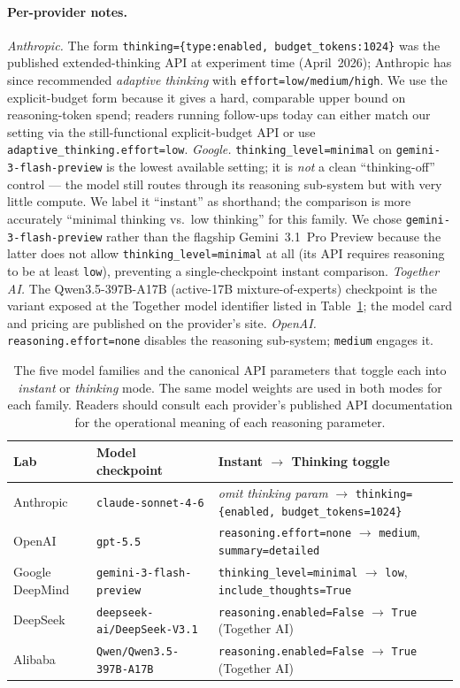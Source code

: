 \documentclass{article}
\begin{document}
\paragraph{Per-provider notes.} \emph{Anthropic.} The form \texttt{thinking=\{type:enabled, budget\_tokens:1024\}} was the published extended-thinking API at experiment time (April~2026); Anthropic has since recommended \emph{adaptive thinking} with \texttt{effort=low/medium/high}. We use the explicit-budget form because it gives a hard, comparable upper bound on reasoning-token spend; readers running follow-ups today can either match our setting via the still-functional explicit-budget API or use \texttt{adaptive\_thinking.effort=low}. \emph{Google.} \texttt{thinking\_level=minimal} on \texttt{gemini-3-flash-preview} is the lowest available setting; it is \emph{not} a clean ``thinking-off'' control --- the model still routes through its reasoning sub-system but with very little compute. We label it ``instant'' as shorthand; the comparison is more accurately ``minimal thinking vs.\ low thinking'' for this family. We chose \texttt{gemini-3-flash-preview} rather than the flagship Gemini~3.1~Pro Preview because the latter does not allow \texttt{thinking\_level=minimal} at all (its API requires reasoning to be at least \texttt{low}), preventing a single-checkpoint instant comparison. \emph{Together AI.} The Qwen3.5-397B-A17B (active-17B mixture-of-experts) checkpoint is the variant exposed at the Together model identifier listed in Table~\ref{tab:models}; the model card and pricing are published on the provider's site. \emph{OpenAI.} \texttt{reasoning.effort=none} disables the reasoning sub-system; \texttt{medium} engages it.

\begin{table}[t]
\centering
\small
\begin{tabular}{lll}
\toprule
Lab & Model checkpoint & Instant $\to$ Thinking toggle \\
\midrule
Anthropic & \texttt{claude-sonnet-4-6} & \emph{omit thinking param} $\to$ \texttt{thinking=\{enabled, budget\_tokens=1024\}} \\
OpenAI & \texttt{gpt-5.5} & \texttt{reasoning.effort=none} $\to$ \texttt{medium}, \texttt{summary=detailed} \\
Google DeepMind & \texttt{gemini-3-flash-preview} & \texttt{thinking\_level=minimal} $\to$ \texttt{low}, \texttt{include\_thoughts=True} \\
DeepSeek & \texttt{deepseek-ai/DeepSeek-V3.1} & \texttt{reasoning.enabled=False} $\to$ \texttt{True} (Together AI) \\
Alibaba & \texttt{Qwen/Qwen3.5-397B-A17B} & \texttt{reasoning.enabled=False} $\to$ \texttt{True} (Together AI) \\
\bottomrule
\end{tabular}
\caption{The five model families and the canonical API parameters that toggle each into \emph{instant} or \emph{thinking} mode. The same model weights are used in both modes for each family. Readers should consult each provider's published API documentation for the operational meaning of each reasoning parameter.}
\label{tab:models}
\end{table}
\end{document}
